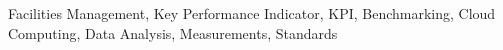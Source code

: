 
% 
% 

\begin{keywords}

Facilities Management, Key Performance Indicator, KPI, Benchmarking, Cloud Computing, Data Analysis, Measurements, Standards

\end{keywords}